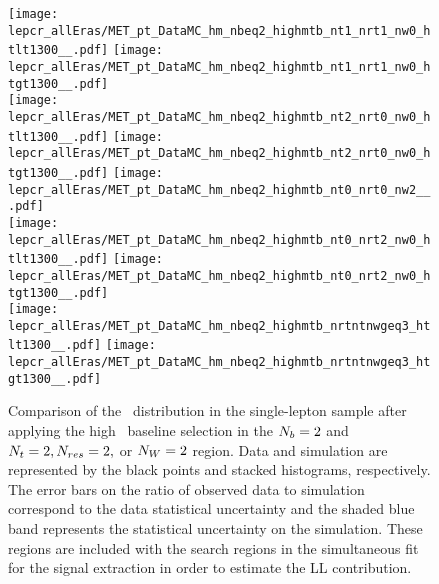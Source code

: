 \begin{figure}[!htb]
	\begin{center}
  \texttt{[image: lepcr\_allEras/MET\_pt\_DataMC\_hm\_nbeq2\_highmtb\_nt1\_nrt1\_nw0\_htlt1300\_\_.pdf]}
  \texttt{[image: lepcr\_allEras/MET\_pt\_DataMC\_hm\_nbeq2\_highmtb\_nt1\_nrt1\_nw0\_htgt1300\_\_.pdf]} \\
  \texttt{[image: lepcr\_allEras/MET\_pt\_DataMC\_hm\_nbeq2\_highmtb\_nt2\_nrt0\_nw0\_htlt1300\_\_.pdf]}
  \texttt{[image: lepcr\_allEras/MET\_pt\_DataMC\_hm\_nbeq2\_highmtb\_nt2\_nrt0\_nw0\_htgt1300\_\_.pdf]} 
  \texttt{[image: lepcr\_allEras/MET\_pt\_DataMC\_hm\_nbeq2\_highmtb\_nt0\_nrt0\_nw2\_\_.pdf]} \\
  \texttt{[image: lepcr\_allEras/MET\_pt\_DataMC\_hm\_nbeq2\_highmtb\_nt0\_nrt2\_nw0\_htlt1300\_\_.pdf]}  
  \texttt{[image: lepcr\_allEras/MET\_pt\_DataMC\_hm\_nbeq2\_highmtb\_nt0\_nrt2\_nw0\_htgt1300\_\_.pdf]} \\
  \texttt{[image: lepcr\_allEras/MET\_pt\_DataMC\_hm\_nbeq2\_highmtb\_nrtntnwgeq3\_htlt1300\_\_.pdf]} 
  \texttt{[image: lepcr\_allEras/MET\_pt\_DataMC\_hm\_nbeq2\_highmtb\_nrtntnwgeq3\_htgt1300\_\_.pdf]} \\
	\end{center}
	\caption[Lost Lepton HM Control Region $\nb=2$ with 2 heavy objects]{Comparison of the \met~distribution in the single-lepton sample after applying the high \dm~baseline selection in the $\nb=2$ and $N_{t}=2, N_{res}=2,$ or $N_{W}=2$ region. Data and simulation are represented by the black points and stacked histograms, respectively. The error bars on the ratio of observed data to simulation correspond to the data statistical uncertainty and the shaded blue band represents the statistical uncertainty on the simulation. These regions are included with the search regions in the simultaneous fit for the signal extraction in order to estimate the LL contribution.
	 }
	\label{fig:llb-1lcr-datavsmc-hm-nb2-2}
\end{figure}


